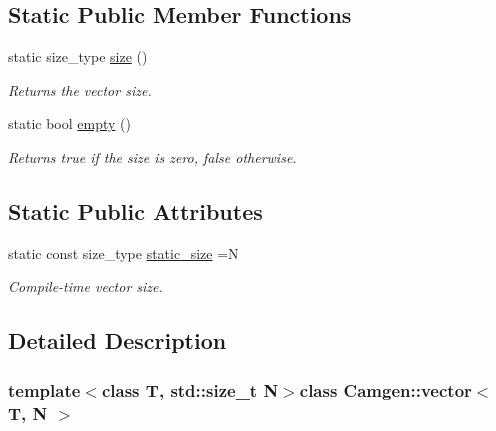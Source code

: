 \subsection*{Static Public Member Functions}
\begin{DoxyCompactItemize}
\item 
\hypertarget{a00559_a922fc7f84c5f4fc54a7dea44197771fb}{static size\-\_\-type \hyperlink{a00559_a922fc7f84c5f4fc54a7dea44197771fb}{size} ()}\label{a00559_a922fc7f84c5f4fc54a7dea44197771fb}

\begin{DoxyCompactList}\small\item\em Returns the vector size. \end{DoxyCompactList}\item 
\hypertarget{a00559_ae76cda59c96ae55ba8e2ed8d1e8c4a07}{static bool \hyperlink{a00559_ae76cda59c96ae55ba8e2ed8d1e8c4a07}{empty} ()}\label{a00559_ae76cda59c96ae55ba8e2ed8d1e8c4a07}

\begin{DoxyCompactList}\small\item\em Returns true if the size is zero, false otherwise. \end{DoxyCompactList}\end{DoxyCompactItemize}
\subsection*{Static Public Attributes}
\begin{DoxyCompactItemize}
\item 
\hypertarget{a00559_a3a494f18dfc722a0528bc01d5a6120ea}{static const size\-\_\-type \hyperlink{a00559_a3a494f18dfc722a0528bc01d5a6120ea}{static\-\_\-size} =N}\label{a00559_a3a494f18dfc722a0528bc01d5a6120ea}

\begin{DoxyCompactList}\small\item\em Compile-\/time vector size. \end{DoxyCompactList}\end{DoxyCompactItemize}


\subsection{Detailed Description}
\subsubsection*{template$<$class T, std\-::size\-\_\-t N$>$class Camgen\-::vector$<$ T, N $>$}

